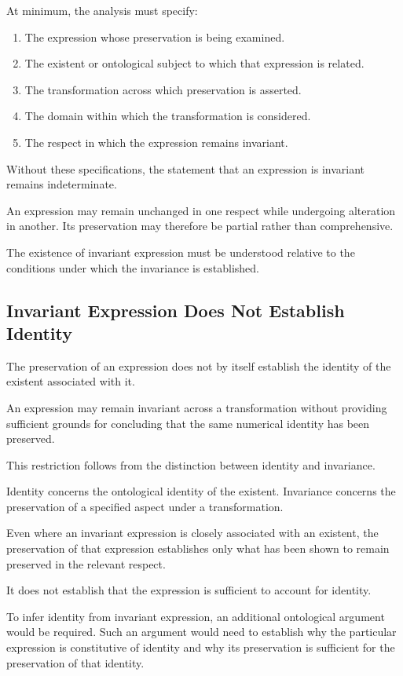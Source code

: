 At minimum, the analysis must specify:

\begin{enumerate}
    \item The expression whose preservation is being examined.
    \item The existent or ontological subject to which
    that expression is related.
    \item The transformation across which preservation
    is asserted.
    \item The domain within which the transformation
    is considered.
    \item The respect in which the expression remains
    invariant.
\end{enumerate}

Without these specifications, the statement that
an expression is invariant remains indeterminate.

An expression may remain unchanged in one respect
while undergoing alteration in another. Its preservation
may therefore be partial rather than comprehensive.

The existence of invariant expression must be
understood relative to the conditions under which
the invariance is established.

\subsection{Invariant Expression Does Not Establish Identity}

The preservation of an expression does not by itself
establish the identity of the existent associated
with it.

An expression may remain invariant across a
transformation without providing sufficient grounds
for concluding that the same numerical identity
has been preserved.

This restriction follows from the distinction
between identity and invariance.

Identity concerns the ontological identity of
the existent. Invariance concerns the preservation
of a specified aspect under a transformation.

Even where an invariant expression is closely
associated with an existent, the preservation
of that expression establishes only what has
been shown to remain preserved in the relevant
respect.

It does not establish that the expression is
sufficient to account for identity.

To infer identity from invariant expression,
an additional ontological argument would be
required. Such an argument would need to establish
why the particular expression is constitutive
of identity and why its preservation is sufficient
for the preservation of that identity.

